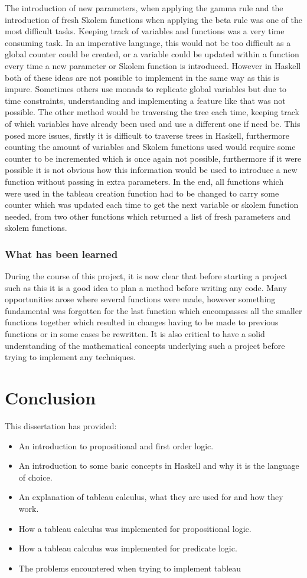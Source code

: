 \documentclass{article}%
\begin{document}
The introduction of new parameters, when applying the gamma rule and the introduction of fresh Skolem functions when applying the beta rule was one of the most difficult tasks. Keeping track of variables and functions was a very time consuming task. In an imperative language, this would not be too difficult as a global counter could be created, or a variable could be updated within a function every time a new parameter or Skolem function is introduced. However in Haskell both of these ideas are not possible to implement in the same way as this is impure. Sometimes others use monads to replicate global variables but due to time constraints, understanding and implementing a feature like that was not possible. The other method would be traversing the tree each time, keeping track of which variables have already been used and use a different one if need be. This posed more issues, firstly it is difficult to traverse trees in Haskell, furthermore counting the amount of variables and Skolem functions used would require some counter to be incremented which is once again not possible, furthermore if it were possible it is not obvious how this information would be used to introduce a new function without passing in extra parameters. In the end, all functions which were used in the tableau creation function had to be changed to carry some counter which was updated each time to get the next variable or skolem function needed, from two other functions which returned a list of fresh parameters and skolem functions. 

\subsubsection{What has been learned}
During the course of this project, it is now clear that before starting a project such as this it is a good idea to plan a method before writing any code. Many opportunities arose where several functions were made, however something fundamental was forgotten for the last function which encompasses all the smaller functions together which resulted in changes having to be made to previous functions or in some cases be rewritten. It is also critical to have a solid understanding of the mathematical concepts underlying such a project before trying to implement any techniques. 
\section{Conclusion}
This dissertation has provided:
\begin{itemize}
\item An introduction to propositional and first order logic.
\item An introduction to some basic concepts in Haskell and why it is the language of choice. 
\item An explanation of tableau calculus, what they are used for and how they work. 
\item How a tableau calculus was implemented for propositional logic.
\item How a tableau calculus was implemented for predicate logic. 
\item The problems encountered when trying to implement tableau
\end{itemize}
\end{document}
